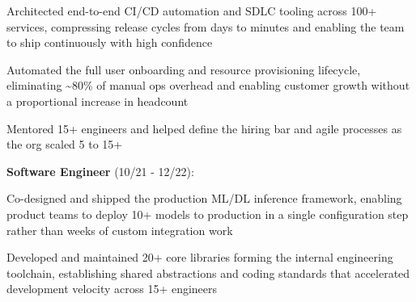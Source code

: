 \documentclass[10pt,letterpaper]{article}
\begin{document}
\begin{justify}
\begin{itemize}[label={}, leftmargin=0pt]
\begin{item}
\begin{itemize}[label={$\bullet$}, leftmargin=12.5pt, noitemsep]
\begin{item}
                        \end{item}
                        \begin{item}
                              Architected end-to-end CI/CD automation and SDLC tooling across 100+ services,
                              compressing release cycles from days to minutes and enabling the team to ship continuously with high confidence
                        \end{item}
                        \begin{item}
                              Automated the full user onboarding and resource provisioning lifecycle,
                              eliminating \textasciitilde{}80\% of manual ops overhead and enabling customer growth without a proportional increase in headcount
                        \end{item}
                        \begin{item}
                              Mentored 15+ engineers and helped define the hiring bar and agile processes as the org scaled 5 to 15+
                        \end{item}
                  \end{itemize}
                  \small{\textbf{Software Engineer} (10/21 - 12/22)}:
                  \vspace{-0.15cm}
                  \begin{itemize}[label={$\bullet$}, leftmargin=12.5pt, noitemsep]
                        \begin{item}
                              Co-designed and shipped the production ML/DL inference framework,
                              enabling product teams to deploy 10+ models to production in a single configuration step rather than weeks of custom integration work
                        \end{item}
                        \begin{item}
                              Developed and maintained 20+ core libraries forming the internal engineering toolchain,
                              establishing shared abstractions and coding standards that accelerated development velocity across 15+ engineers
                        \end{item}
                  \end{itemize}
            \end{item}
            \vspace{0.05cm}
            \begin{item}

\end{item}
\end{itemize}
\end{justify}
\end{document}
